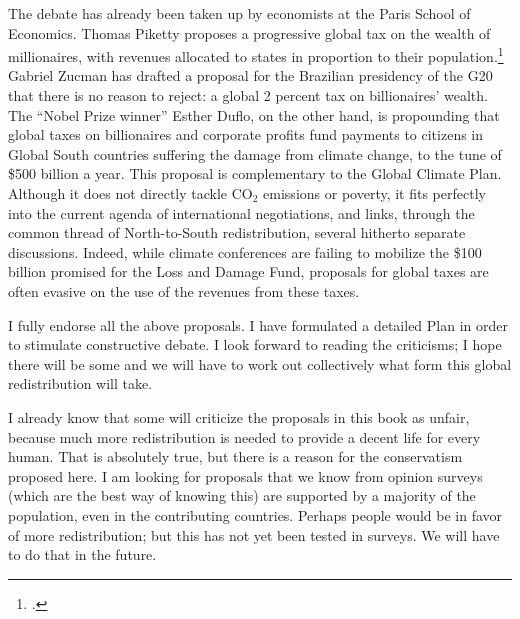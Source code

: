 \documentclass[a5paper,english,openany]{memoir}
\begin{document}
The debate has already been taken up by economists at the Paris School of Economics. Thomas Piketty proposes %
a progressive global tax on the wealth of millionaires, with revenues allocated to states in proportion to their population.\footnote{\citet{piketty_brief_2022}.} 
Gabriel Zucman has drafted a proposal for the Brazilian presidency of the G20 that there is no reason to reject: a global 2 percent tax on billionaires' wealth. %
The ``Nobel Prize winner'' %
Esther Duflo, on the other hand, is propounding %
that global taxes on billionaires and corporate profits fund payments to citizens in Global South countries suffering the damage from %
climate change, to the tune of \$500 billion a year. This proposal is complementary to the Global Climate Plan. Although %
it does not directly tackle CO$_\text{2}$ emissions or poverty, it fits perfectly into the current agenda of international negotiations, and links, through the common thread of North-to-South redistribution,  %
several hitherto separate discussions. Indeed, while climate conferences are failing to mobilize %
the \$100 billion promised for the Loss and Damage Fund, proposals for global taxes are often evasive on the use of the revenues from these taxes. 

I fully endorse all %
the above proposals. I have formulated a detailed Plan in order to stimulate constructive debate. I look forward to reading the criticisms; I hope there will be some %
and we will have to work out collectively what form this global redistribution will take. 

I already know that some will criticize %
the proposals in this book as unfair, %
because much more redistribution is needed to provide a decent life %
for every human. That is %
absolutely true, but there is %
a reason for the conservatism proposed here. 
I am looking for proposals that we know from opinion surveys (which are the best way of knowing this) are supported by a majority of the population, even in the contributing countries. Perhaps people would be in favor %
of more redistribution; but this has not yet been tested in surveys. We will have to do that in the future.  %
\end{document}
